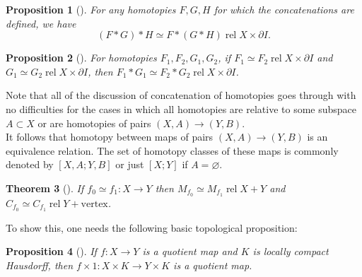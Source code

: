 \documentclass[reqno]{amsart}
\newtheorem{theorem}{Theorem}[section]
\newtheorem{proposition}[theorem]{Proposition}
\theoremstyle{definition}
\theoremstyle{remark}
\DeclareMathOperator{\rel}{rel}
\begin{document}
\begin{proposition}[]
    For any homotopies $F,G,H$ for which the
    concatenations 
     are defined, we have
     \[
         \left( F * G  \right) * H
         \simeq F * \left( G * H \right) 
         \rel X \times \partial I.
     \] 
\end{proposition}


\begin{proposition}[]
    For homotopies $F_1, F_2, G_1, G_2$,
    if $F_1 \simeq F_2 \rel X \times \partial I$ and
    $G_1 \simeq G_2 \rel X \times \partial I$, then
    $F_1 * G_1 \simeq F_2 * G_2 \rel X \times \partial I$.
\end{proposition}

Note that all of the discussion of concatenation of
homotopies goes through with no difficulties for the cases
in which all homotopies are relative to some subspace
$A \subset X$ or are homotopies of pairs
$\left( X, A  \right) \to \left( Y, B \right) $.\\
It follows that homotopy between maps of
pairs $\left( X,A \right) \to \left( Y,B \right) $ is
an equivalence relation. The set of homotopy classes
of these maps is commonly denoted by
$\left[ X,A ; Y ,B \right] $ or just
$\left[ X;Y \right] $ if $A = \varnothing$.

\begin{theorem}[]\label{Thm:299221}
    If $f_0 \simeq f_1 \colon X \to Y$ then
    $M_{f_0} \simeq M_{f_1} \rel
    X + Y$ and
    $C_{f_0} \simeq C_{f_1} \rel
    Y + \text{vertex}$.
\end{theorem}


To show this, one needs the following basic topological
proposition:
\begin{proposition}[] \label{prop:92031999}
    If $f \colon X \to Y$ is a quotient map and
    $K$ is locally compact Hausdorff, then
    $f \times 1 \colon X \times K \to Y \times K$ is
    a quotient map.
\end{proposition}
\end{document}
